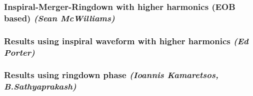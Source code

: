 \documentclass{iopart}
\begin{document}
\subsubsection{Inspiral-Merger-Ringdown with higher harmonics (EOB based)  {\it (Sean McWilliams)}}
\label{SSS:MBHbPEPhenomAEI}



\subsubsection{Results using inspiral waveform with higher harmonics  {\it (Ed Porter)}}
\label{SSS:MBHbPEInspHHEd}


\subsubsection{Results using ringdown phase  {\it (Ioannis Kamaretsos, B.Sathyaprakash)}}
\label{SSS:MBHbPERingdown}


\end{document}
